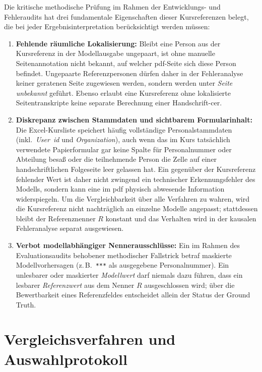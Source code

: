 Die kritische methodische Prüfung im Rahmen der Entwicklungs- und Fehleraudits hat drei fundamentale Eigenschaften dieser Kursreferenzen belegt, die bei jeder Ergebnisinterpretation berücksichtigt werden müssen:
\begin{enumerate}
  \item \textbf{Fehlende räumliche Lokalisierung:} Bleibt eine Person aus der Kursreferenz in der Modellausgabe ungepaart, ist ohne manuelle Seitenannotation nicht bekannt, auf welcher \ac{pdf}-Seite sich diese Person befindet. Ungepaarte Referenzpersonen dürfen daher in der Fehleranalyse keiner geratenen Seite zugewiesen werden, sondern werden unter \emph{Seite unbekannt} geführt. Ebenso erlaubt eine Kursreferenz ohne lokalisierte Seitentranskripte keine separate Berechnung einer Handschrift-\ac{cer}.
  \item \textbf{Diskrepanz zwischen Stammdaten und sichtbarem Formularinhalt:} Die Excel-Kursliste speichert häufig vollständige Personalstammdaten (inkl.\ \emph{User~\ac{id}} und \emph{Organization}), auch wenn das im Kurs tatsächlich verwendete Papierformular gar keine Spalte für Personalnummer oder Abteilung besaß oder die teilnehmende Person die Zelle auf einer handschriftlichen Folgeseite leer gelassen hat. Ein gegenüber der Kursreferenz fehlender Wert ist daher nicht zwingend ein technischer Erkennungsfehler des Modells, sondern kann eine im \ac{pdf} physisch abwesende Information widerspiegeln. Um die Vergleichbarkeit über alle Verfahren zu wahren, wird die Kursreferenz nicht nachträglich an einzelne Modelle angepasst; stattdessen bleibt der Referenznenner $R$ konstant und das Verhalten wird in der kausalen Fehleranalyse separat ausgewiesen.
  \item \textbf{Verbot modellabhängiger Nennerausschlüsse:} Ein im Rahmen des Evaluationsaudits behobener methodischer Fallstrick betraf maskierte Modellvorhersagen (z.\,B.\ \texttt{***} als ausgegebene Personalnummer). Ein unlesbarer oder maskierter \emph{Modellwert} darf niemals dazu führen, dass ein lesbarer \emph{Referenzwert} aus dem Nenner $R$ ausgeschlossen wird; über die Bewertbarkeit eines Referenzfeldes entscheidet allein der Status der Ground Truth.
\end{enumerate}

\section{Vergleichsverfahren und Auswahlprotokoll}
\label{sec:verfahrensauswahl}

